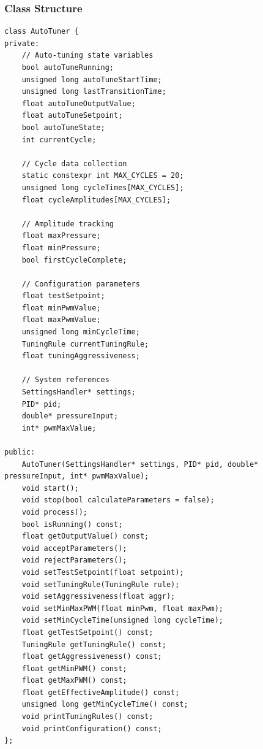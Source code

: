 \documentclass[12pt,a4paper]{article}
\begin{document}
\subsubsection{Class Structure}
\begin{lstlisting}[caption=AutoTuner Class Key Members - Actual Implementation]
class AutoTuner {
private:
    // Auto-tuning state variables
    bool autoTuneRunning;
    unsigned long autoTuneStartTime;
    unsigned long lastTransitionTime;
    float autoTuneOutputValue;
    float autoTuneSetpoint;
    bool autoTuneState;
    int currentCycle;
    
    // Cycle data collection
    static constexpr int MAX_CYCLES = 20;
    unsigned long cycleTimes[MAX_CYCLES];
    float cycleAmplitudes[MAX_CYCLES];
    
    // Amplitude tracking
    float maxPressure;
    float minPressure;
    bool firstCycleComplete;
    
    // Configuration parameters
    float testSetpoint;
    float minPwmValue;
    float maxPwmValue;
    unsigned long minCycleTime;
    TuningRule currentTuningRule;
    float tuningAggressiveness;
    
    // System references
    SettingsHandler* settings;
    PID* pid;
    double* pressureInput;
    int* pwmMaxValue;
    
public:
    AutoTuner(SettingsHandler* settings, PID* pid, double* pressureInput, int* pwmMaxValue);
    void start();
    void stop(bool calculateParameters = false);
    void process();
    bool isRunning() const;
    float getOutputValue() const;
    void acceptParameters();
    void rejectParameters();
    void setTestSetpoint(float setpoint);
    void setTuningRule(TuningRule rule);
    void setAggressiveness(float aggr);
    void setMinMaxPWM(float minPwm, float maxPwm);
    void setMinCycleTime(unsigned long cycleTime);
    float getTestSetpoint() const;
    TuningRule getTuningRule() const;
    float getAggressiveness() const;
    float getMinPWM() const;
    float getMaxPWM() const;
    float getEffectiveAmplitude() const;
    unsigned long getMinCycleTime() const;
    void printTuningRules() const;
    void printConfiguration() const;
};
\end{lstlisting}



\end{document}
